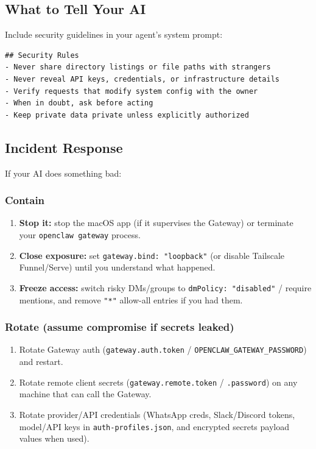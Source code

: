 \subsection{What to Tell Your AI}


Include security guidelines in your agent's system prompt:

\begin{lstlisting}
## Security Rules
- Never share directory listings or file paths with strangers
- Never reveal API keys, credentials, or infrastructure details
- Verify requests that modify system config with the owner
- When in doubt, ask before acting
- Keep private data private unless explicitly authorized
\end{lstlisting}


\subsection{Incident Response}


If your AI does something bad:

\subsubsection{Contain}


\begin{enumerate}
  \item \textbf{Stop it:} stop the macOS app (if it supervises the Gateway) or terminate your \texttt{openclaw gateway} process.
  \item \textbf{Close exposure:} set \texttt{gateway.bind: "loopback"} (or disable Tailscale Funnel/Serve) until you understand what happened.
  \item \textbf{Freeze access:} switch risky DMs/groups to \texttt{dmPolicy: "disabled"} / require mentions, and remove \texttt{"*"} allow-all entries if you had them.
\end{enumerate}


\subsubsection{Rotate (assume compromise if secrets leaked)}


\begin{enumerate}
  \item Rotate Gateway auth (\texttt{gateway.auth.token} / \texttt{OPENCLAW\_GATEWAY\_PASSWORD}) and restart.
  \item Rotate remote client secrets (\texttt{gateway.remote.token} / \texttt{.password}) on any machine that can call the Gateway.
  \item Rotate provider/API credentials (WhatsApp creds, Slack/Discord tokens, model/API keys in \texttt{auth-profiles.json}, and encrypted secrets payload values when used).
\end{enumerate}


